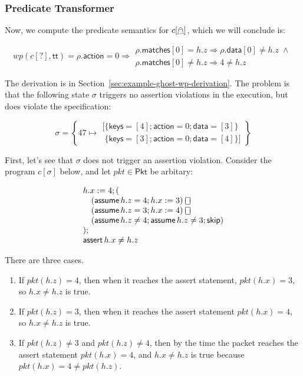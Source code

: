 \documentclass{article}
\newcommand{\pkt}{\mathit{pkt}}
\newcommand{\TRUE}{\mathsf{tt}}
\newcommand{\Pkt}{\mathsf{Pkt}}
\newcommand{\matches}{\mathsf{matches}}
\newcommand{\action}{\mathsf{action}}
\newcommand{\keys}{\mathsf{keys}}
\newcommand{\data}{\mathsf{data}}
\newcommand{\assert}{\mathop{\mathsf{assert}}}
\newcommand{\assume}{\mathop{\mathsf{assume}}}
\newcommand{\choiceop}{\rotatebox[origin=c]{90}{$\sqsubset\!\!\!\sqsupset$}}
\newcommand{\choice}{\mathbin{\choiceop}}
\newcommand{\SKIP}{\mathsf{skip}}
\newcommand{\WP}{\textit{wp}}
\newcommand{\ginstr}{[\mathghost]}
\begin{document}
\subsubsection{Predicate Transformer}
Now, we compute the predicate semantics for $c\ginstr$, which we will conclude is:

\[\WP(c[?],\TRUE) =\rho.\action = 0 \Rightarrow
\begin{array}{l}
  \rho.\matches[0] = h.z \Rightarrow \rho.\data[0] \neq h.z\;\wedge \\
  \rho.\matches[0] \neq h.z \Rightarrow 4 \neq h.z
  \end{array}
\]

The derivation is in Section~\ref{sec:example-ghost-wp-derivation}. The problem is
that the following state $\sigma$ triggers no assertion violations in the execution, but does violate the specification:

\[\sigma = \left\{ 47 \mapsto \begin{array}{l}
  [\{\keys = [4]; \action = 0;\data = [3]\}\\
  \phantom[  \{\keys = [3]; \action = 0; \data = [4]\}
  ]
\end{array}
\right\} \]

First, let's see that $\sigma$ does not trigger an assertion violation. Consider
the program $c[\sigma]$ below, and let $\pkt \in \Pkt$ be arbitary:

\[
\begin{array}{l}
  h.x := 4; (\\
  \quad (\assume h.z = 4; h.x := 3)\;\choice \\
  \quad (\assume h.z = 3; h.x := 4)\;\choice \\
  \quad (\assume h.z \neq 4; \assume h.z \neq 3; \SKIP) \\
  ); \\
  \assert h.x \neq h.z
\end{array}
\]

There are three cases.
\begin{enumerate}
  \item If $\pkt(h.z) = 4$, then when it reaches the assert statement, $\pkt(h.x) =
    3$, so $h.x \neq h.z$ is true.
  \item If $\pkt(h.z) = 3$, then when it reaches the assert statement $\pkt(h.x) = 4$, so $h.x \neq h.z$ is true.
  \item If $\pkt(h.z) \neq 3$ and $\pkt(h.z) \neq 4$, then by the time the
    packet reaches the assert statement $\pkt(h.x) = 4$, and $h.x \neq h.z$ is
    true because $\pkt(h.x) = 4 \neq \pkt(h.z)$.
\end{enumerate}
\end{document}
